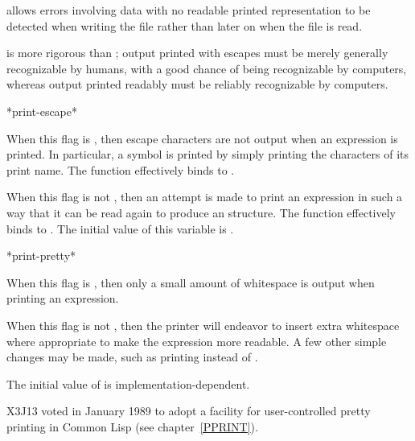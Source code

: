 \begin{newer}
\begin{defun}[Variable]
   allows errors involving data with no
  readable printed representation to be detected when writing the file rather than
  later on when the file is read.

   is more rigorous than ; output printed
  with escapes must be merely generally recognizable by humans, with a good chance
  of being recognizable by computers, whereas
  output printed readably must be reliably recognizable by computers.
\end{defun}
\end{newer}

\begin{defun}[Variable]
*print-escape*

When this flag is {\false}, then escape characters are not output
when an expression is printed.  In particular, a symbol is printed
by simply printing the characters of its print name.
The function  effectively binds  to {\false}.

When this flag is not {\false}, then an attempt is made to print an
expression in such a way that it can be read again to produce an
 structure.
The function  effectively binds  to {\true}.
The initial value of this variable is {\true}.
\end{defun}

\begin{defun}[Variable]
*print-pretty*

When this flag is {\false}, then only a small amount of whitespace is
output when printing an expression.

When this flag is not {\false}, then the printer will endeavor to insert
extra whitespace where appropriate to make the expression more readable.
A few other simple changes may be made, such as printing 
instead of .

The initial value of  is implementation-dependent.

\begin{new}
X3J13 voted in January 1989
to adopt a facility for user-controlled pretty printing
in Common Lisp
(see chapter~\ref{PPRINT}).
\end{new}
\end{defun}

